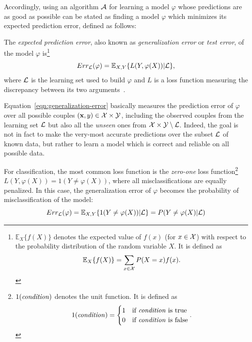 Accordingly, using an algorithm ${\cal A}$ for learning a model $\varphi$ whose
predictions are as good as possible can be stated as finding a model $\varphi$
which minimizes its expected prediction error, defined as follows:

\begin{definition}
The \emph{expected prediction error}, also known as \emph{generalization
error} or \emph{test error}, of the model $\varphi$ is\footnote{$\mathbb{E}_X \{f(X)\}$ denotes the expected value of $f(x)$
(for $x \in {\cal X}$) with respect to the probability distribution of the
random variable $X$. It is defined as $$\mathbb{E}_X \{f(X)\} = \sum_{x \in {\cal
X}} P(X=x) f(x).$$}
\begin{equation}\label{eqn:generalization-error}
Err_{{\cal L}}(\varphi) = \mathbb{E}_{X, Y}\{ L(Y, \varphi(X)) | {\cal L} \},
\end{equation}
where ${\cal L}$ is the learning set used to build $\varphi$ and $L$ is a loss
function measuring the discrepancy between its two
arguments~\citep{geurts:2002}.
\end{definition}

Equation~\ref{eqn:generalization-error} basically measures the prediction error of $\varphi$ over all
possible couples $(\mathbf{x}, y)\in {\cal X}\times{\cal Y}$, including the
observed couples from the learning set ${\cal L}$ but also all the
\textit{unseen} ones from ${\cal X}\times{\cal Y} \setminus {\cal L}$. Indeed,
the goal is not in fact to make the very-most accurate predictions over the
subset ${\cal L}$ of known data, but rather to learn a model which is correct
and reliable on all possible data.

For classification, the most common loss function is the \textit{zero-one} loss
function\footnote{$1(\text{\textit{condition}})$ denotes the unit function. It
is defined as
$$1(\text{\textit{condition}}) =
\begin{cases}
1 & \text{if \textit{condition} is true}\\
0 & \text{if \textit{condition} is false}
\end{cases}.
$$} $L(Y, \varphi(X)) = 1(Y \neq \varphi(X))$, where all
misclassifications are equally penalized. In this case, the generalization
error of $\varphi$ becomes the probability of misclassification of the model:
\begin{equation}
Err_{\cal L}(\varphi) = \mathbb{E}_{X, Y}\{ 1(Y \neq \varphi(X)) | {\cal L} \} = P(Y \neq \varphi(X)|{\cal L})
\end{equation}

